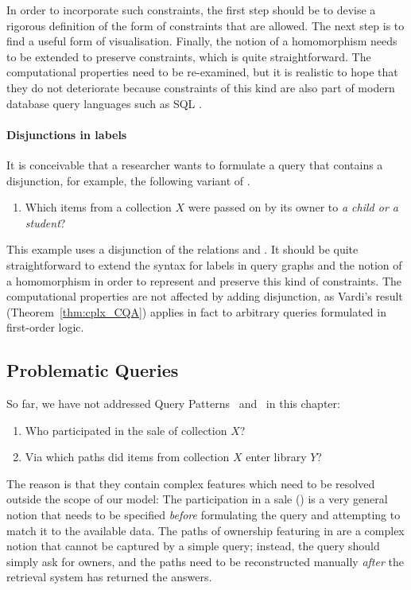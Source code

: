 In order to incorporate such constraints,
the first step should be to devise a rigorous definition of the form of constraints that are allowed.
The next step is to find a useful form of visualisation.
Finally, the notion of a homomorphism needs to be extended to preserve constraints,
which is quite straightforward.
The computational properties need to be re-examined, but it is realistic to hope
that they do not deteriorate because constraints of this kind are also part of
modern database query languages such as SQL \autocite{SQL}.

\paragraph{Disjunctions in labels}

It is conceivable that a researcher wants to formulate a query that contains a disjunction,
for example, the following variant of .
%
\begin{enumerate}
  \item[\exaquery{4$'$}]
    Which items from a collection $X$ were passed on by its owner to \emph{a child or a student}?
\end{enumerate}
%
This example uses a disjunction of the relations  and .
It should be quite straightforward to extend the syntax for labels in query graphs
and the notion of a homomorphism in order to represent and preserve this kind of constraints.
The computational properties are not affected by adding disjunction,
as Vardi's result (Theorem~\ref{thm:cplx_CQA}) applies in fact to arbitrary queries formulated in first-order logic.

\subsection{Problematic Queries}

So far, we have not addressed Query Patterns~ and~ in this chapter:
%
\begin{enumerate}
  \item[\exaquery{6}]
    Who participated in the sale of collection $X$?
  \item[\exaquery{7}]
    Via which paths did items from collection $X$ enter library $Y$?
\end{enumerate}
%
The reason is that they contain complex features which need to be resolved outside the scope of our model:
The participation in a sale () is a very general notion that needs to be specified
\emph{before} formulating the query and attempting to match it to the available data.
The paths of ownership featuring in  are a complex notion that cannot be captured by a simple query;
instead, the query should simply ask for owners, and the paths need to be reconstructed manually
\emph{after} the retrieval system has returned the answers.

